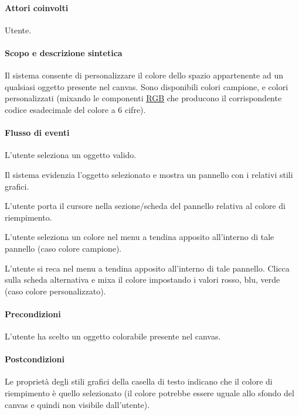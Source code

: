 \paragraph{Attori coinvolti} Utente.
\paragraph{Scopo e descrizione sintetica}   Il sistema consente di personalizzare il colore dello spazio appartenente ad un qualsiasi oggetto presente nel canvas. Sono disponibili colori campione, e colori personalizzati (mixando le componenti \underline{RGB} che producono il corrispondente codice esadecimale del colore a 6 cifre).
\paragraph{Flusso di eventi}
\begin{elenconumerato}[\textbf{}]{\subsubsecindent}
\item L'utente seleziona un oggetto valido.
\item Il sistema evidenzia l'oggetto selezionato e mostra un pannello con i relativi stili grafici.
\item L'utente porta il cursore nella sezione/scheda del pannello relativa al colore di riempimento.
\item L'utente seleziona un colore nel menu a tendina apposito all'interno di tale pannello (caso colore campione).
\item L'utente si reca nel menu a tendina apposito all'interno di tale pannello. Clicca sulla scheda alternativa e mixa il colore impostando i valori rosso, blu, verde (caso colore personalizzato).
\end{elenconumerato}
\paragraph{Precondizioni}L'utente ha scelto un oggetto colorabile presente nel canvas.
\paragraph{Postcondizioni}Le propriet\` a degli stili grafici della casella di testo indicano che il colore di riempimento \` e  quello selezionato (il colore potrebbe essere uguale allo sfondo del canvas e quindi non visibile dall'utente).



